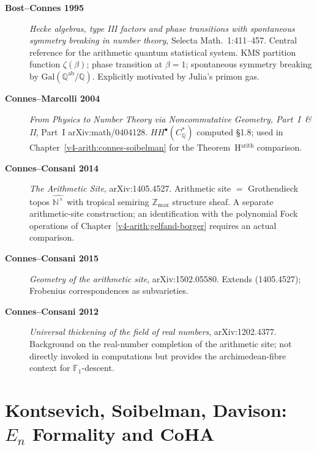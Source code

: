\begin{description}
\item[\textbf{Bost--Connes 1995}] \emph{Hecke algebras, type III
factors and phase transitions with spontaneous symmetry breaking in
number theory}, Selecta Math.~1:411--457. Central reference for
the arithmetic quantum statistical system. KMS partition function
\(\zeta(\beta)\); phase transition at \(\beta=1\); spontaneous
symmetry breaking by \(\mathrm{Gal}(\mathbb{Q}^{\mathrm{ab}}/\mathbb{Q})\).
Explicitly motivated by Julia's primon gas.
\item[\textbf{Connes--Marcolli 2004}] \emph{From Physics to Number
Theory via Noncommutative Geometry, Part~I~\& II},
Part~I arXiv:math/0404128. \(HH^{\bullet}(C^{*}_{\mathbb{Q}})\)
computed \S1.8; used in Chapter~\ref{v4-arith:connes-soibelman}
for the Theorem~H\(^{\mathrm{arith}}\) comparison.
\item[\textbf{Connes--Consani 2014}] \emph{The Arithmetic Site},
arXiv:1405.4527. Arithmetic site \(=\) Grothendieck topos
\(\widehat{\mathbb{N}^{\times}}\) with tropical semiring
\(\mathbb{Z}_{\max}\) structure sheaf. A separate arithmetic-site construction; an identification with
the polynomial Fock operations of
Chapter~\ref{v4-arith:gelfand-borger} requires an actual comparison.
\item[\textbf{Connes--Consani 2015}] \emph{Geometry of the
arithmetic site}, arXiv:1502.05580. Extends (1405.4527); Frobenius
correspondences as subvarieties.
\item[\textbf{Connes--Consani 2012}] \emph{Universal thickening of
the field of real numbers}, arXiv:1202.4377. Background on the
real-number completion of the arithmetic site; not directly invoked
in computations but provides the archimedean-fibre context for
\(\mathbb{F}_{1}\)-descent.
\end{description}

\section{Kontsevich, Soibelman, Davison: \(E_{n}\) Formality and CoHA}
\label{v4-arith:app:A:kontsevich-etc}

